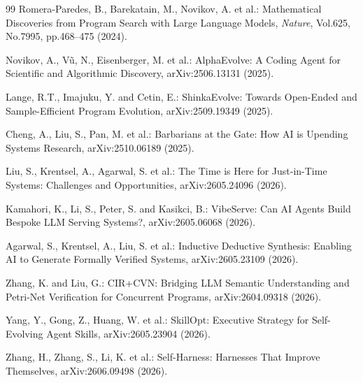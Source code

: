 \documentclass[submit,techrep,noauthor]{ipsj}
\begin{document}
\begin{thebibliography}{99}
Romera-Paredes, B., Barekatain, M., Novikov, A. et al.: Mathematical Discoveries from Program Search with Large Language Models, {\it Nature}, Vol.625, No.7995, pp.468--475 (2024).

Novikov, A., V\~{u}, N., Eisenberger, M. et al.: AlphaEvolve: A Coding Agent for Scientific and Algorithmic Discovery, arXiv:2506.13131 (2025).

Lange, R.T., Imajuku, Y. and Cetin, E.: ShinkaEvolve: Towards Open-Ended and Sample-Efficient Program Evolution, arXiv:2509.19349 (2025).

Cheng, A., Liu, S., Pan, M. et al.: Barbarians at the Gate: How AI is Upending Systems Research, arXiv:2510.06189 (2025).

Liu, S., Krentsel, A., Agarwal, S. et al.: The Time is Here for Just-in-Time Systems: Challenges and Opportunities, arXiv:2605.24096 (2026).

Kamahori, K., Li, S., Peter, S. and Kasikci, B.: VibeServe: Can AI Agents Build Bespoke LLM Serving Systems?, arXiv:2605.06068 (2026).

Agarwal, S., Krentsel, A., Liu, S. et al.: Inductive Deductive Synthesis: Enabling AI to Generate Formally Verified Systems, arXiv:2605.23109 (2026).

Zhang, K. and Liu, G.: CIR+CVN: Bridging LLM Semantic Understanding and Petri-Net Verification for Concurrent Programs, arXiv:2604.09318 (2026).

Yang, Y., Gong, Z., Huang, W. et al.: SkillOpt: Executive Strategy for Self-Evolving Agent Skills, arXiv:2605.23904 (2026).

Zhang, H., Zhang, S., Li, K. et al.: Self-Harness: Harnesses That Improve Themselves, arXiv:2606.09498 (2026).

\end{thebibliography}
\end{document}

